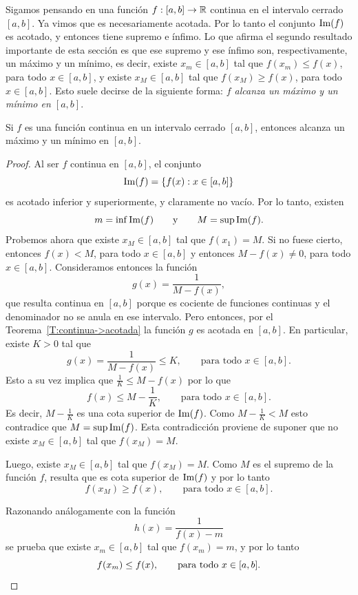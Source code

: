 Sigamos pensando en una función $f:[a,b]\to\mathbb{R}$ continua en el intervalo cerrado $[a,b]$. Ya vimos que es necesariamente acotada. Por lo tanto el conjunto $\operatorname{Im}(f)$ es acotado, y entonces tiene supremo e ínfimo.
Lo que afirma el segundo resultado importante de esta sección es que ese supremo y ese ínfimo son, respectivamente, un máximo y un mínimo, es decir, existe $x_m\in[a,b]$ tal que $f(x_m)\le f(x)$, para todo $x\in[a,b]$, y existe $x_M\in[a,b]$ tal que $f(x_M)\ge f(x)$, para todo $x\in[a,b]$. Esto suele decirse de la siguiente forma: \emph{$f$ alcanza un máximo y un mínimo en $[a,b]$}.

\begin{theorem}\label{T:continua->maximo y minimo}
    Si $f$ es una función continua en un intervalo cerrado $[a,b]$, entonces alcanza un máximo y un mínimo en $[a,b]$.
\end{theorem}

\begin{proof}
    Al ser $f$ continua en $[a,b]$, el conjunto
    \[
    \operatorname{Im}(f)=\{f(x) : x\in[a,b]\}
    \]
    es acotado inferior y superiormente, y claramente no vacío.
    Por lo tanto, existen
    \[
    m=\inf \operatorname{Im}(f)
    \qquad\text{y}\qquad
    M=\sup \operatorname{Im}(f).
    \]
    Probemos ahora que existe $x_M\in[a,b]$ tal que $f(x_1)=M$.
    Si no fuese cierto, entonces $f(x)<M$, para todo $x\in[a,b]$ y entonces $M-f(x)\neq 0$, para todo $x\in[a,b]$.
    Consideramos entonces la función
    \[
    g(x)=\frac{1}{M-f(x)},
    \]
    que resulta continua en $[a,b]$ porque es cociente de funciones continuas y el denominador no se anula en ese intervalo.
    Pero entonces, por el Teorema~\ref{T:continua->acotada} la función $g$ es acotada en $[a,b]$. En particular, existe $K>0$ tal que 
    \[
    g(x)=\frac{1}{M-f(x)}\le K,
    \qquad\text{para todo $x\in[a,b]$}.
    \]
    Esto a su vez implica que $\frac1K \le M -f(x)$ por lo que
    \[
    f(x)\le M-\frac1K,
    \qquad\text{para todo $x\in[a,b]$}.
    \]
    Es decir, $M-\frac1K$ es una cota superior de $\operatorname{Im}(f)$.
    Como $M-\frac1K<M$ esto contradice que $M=\sup\operatorname{Im}(f)$.
    Esta contradicción proviene de suponer que no existe $x_M\in[a,b]$ tal que $f(x_M)=M$.
    
    Luego, existe $x_M\in[a,b]$ tal que $f(x_M)=M$.
    Como $M$ es el supremo de la función $f$, resulta que es cota superior de $\operatorname{Im}(f)$ y por lo tanto
    \[
    f(x_M)\ge f(x), 
    \qquad\text{para todo $x\in[a,b]$}.
    \]

    Razonando análogamente con la función
    \[
    h(x) = \frac1{f(x)-m}
    \]
    se prueba que existe $x_m\in [a,b]$ tal que $f(x_m)=m$, y por lo tanto
    \[
    f(x_m)\le f(x), 
    \qquad\text{para todo $x\in[a,b]$}.
    \qedhere
    \]
\end{proof}

